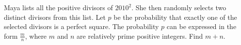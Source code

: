 Maya lists all the positive divisors of $ 2010^2$. She then randomly selects two distinct divisors from this list. Let $ p$ be the probability that exactly one of the selected divisors is a perfect square. The probability $ p$ can be expressed in the form $ \frac{m}{n}$, where $ m$ and $ n$ are relatively prime positive integers. Find $ m + n$.